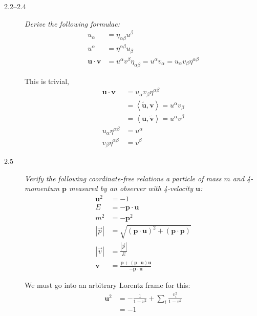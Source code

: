 \documentclass[12pt]{report}
\newcommand{\abs}[1]{\left|#1\right|}
\newcommand{\bm}[1]{\boldsymbol{\mathbf{#1}}}
\newcommand{\expvalue}[1]{\left<#1\right>}
\begin{document}
\begin{description}
    \item[2.2--2.4] \emph{Derive the following formulae:}
        \begin{align*}
            u_\alpha &= \eta_{\alpha\beta}u^\beta\\
            u^\alpha &= \eta^{\alpha\beta}u_\beta\\
            \bm{u} \cdot \bm{v} &= u^\alpha v^\beta \eta_{\alpha\beta}
                = u^\alpha v_\alpha
                = u_\alpha v_\beta \eta^{\alpha\beta}
        \end{align*}

        This is trivial,
        \begin{align}
            \bm{u} \cdot \bm{v} &= u_\alpha v_\beta \eta^{\alpha\beta}
                \nonumber\\
            &= \expvalue{\bm{\tilde{u}}, \bm{v}} = u^\alpha v_\beta
                \nonumber\\
            &= \expvalue{\bm{u}, \bm{\tilde{v}}} = u^\alpha v^\beta
                \nonumber\\
            u_\alpha \eta^{\alpha\beta} &= u^\alpha\\
            v_\beta \eta^{\alpha\beta} &= v^\beta
        \end{align}

    \item[2.5] \emph{Verify the following coordinate-free relations a particle
        of mass $m$ and 4-momentum $\bm{p}$ measured by an observer with
        4-velocity $\bm{u}$:}
        \begin{align*}
            \bm{u}^2 &= -1\\
            E &= -\bm{p} \cdot \bm{u}\\
            m^2 &= -\bm{p}^2\\
            \abs{\vec{p}} &= \sqrt{(\bm{p} \cdot \bm{u})^2 +
                (\bm{p} \cdot \bm{p})}\\
            \abs{\vec{v}} &= \frac{\abs{\vec{p}}}{E}\\
            \bm{v} &= \frac{\bm{p + (\bm{p} \cdot
                \bm{u})\bm{u}}}{-\bm{p} \cdot \bm{u}}
        \end{align*}

        We must go into an arbitrary Lorentz frame for this:
        \begin{align}
            \bm{u}^2 &= -\frac{1}{1 - v^2} + \sum\limits_{i}^{}
                \frac{v_i^2}{1 - v^2} \nonumber\\
            &= -1
        \end{align}


\end{description}
\end{document}
